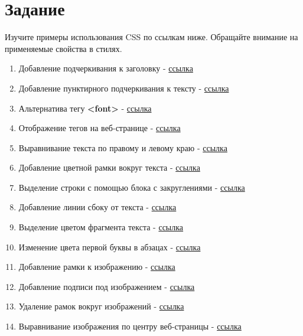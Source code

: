 \documentclass[a4paper,12pt]{extarticle}
\begin{document}
\section{Задание}
Изучите примеры использования CSS по ссылкам ниже. Обращайте внимание на
применяемые свойства в стилях.
\begin{enumerate}
  \item Добавление подчеркивания к заголовку - \href{https://htmlbook.ru/faq/kak-dobavit-podcherkivanie-k-zagolovku}{ссылка}
  \item Добавление пунктирного подчеркивания к тексту - \href{https://htmlbook.ru/faq/kak-sdelat-punktirnoe-podcherkivanie-teksta}{ссылка}
  \item Альтернатива тегу \textbf{<font>} - \href{https://htmlbook.ru/faq/kak-mne-oboytis-bez-tega-font}{ссылка}
  \item Отображение тегов на веб-странице - \href{https://htmlbook.ru/faq/kak-otobrazit-tegi-na-veb-stranitse}{ссылка}
  \item Выравнивание текста по правому и левому краю - \href{https://htmlbook.ru/faq/kak-vyrovnyat-tekst-odnovremenno-po-pravomu-i-levomu-kra}{ссылка}
  \item Добавление цветной рамки вокруг текста - \href{https://htmlbook.ru/faq/kak-dobavit-vokrug-teksta-ramku-opredelennogo-tsveta}{ссылка}
  \item  Выделение строки с помощью блока с закруглениями - \href{https://htmlbook.ru/faq/kak-vydelit-stroku-s-pomoshchyu-bloka-s-zakrugleniyami}{ссылка}
  \item Добавление линии сбоку от текста - \href{https://htmlbook.ru/faq/kak-dobavit-liniyu-vozle-teksta}{ссылка}
  \item Выделение цветом фрагмента текста - \href{https://htmlbook.ru/faq/kak-vydelit-drugim-tsvetom-fragment-teksta}{ссылка}
  \item Изменение цвета первой буквы в абзацах - \href{https://htmlbook.ru/faq/khochu-izmenit-tsvet-pervoy-bukvy-v-kazhdom-abzatse}{ссылка}
  \item Добавление рамки к изображению - \href{https://htmlbook.ru/faq/kak-dobavit-ramku-k-izobrazheniyu}{ссылка}
  \item Добавление подписи под изображением - \href{https://htmlbook.ru/faq/kak-dobavit-podpis-pod-fotografiey}{ссылка}
  \item Удаление рамок вокруг изображений - \href{https://htmlbook.ru/faq/kak-ubrat-ramku-vokrug-izobrazheniy-ssylok}{ссылка}
  \item Выравнивание изображения по центру веб-страницы - \href{https://htmlbook.ru/faq/kak-vyrovnyat-fotografiyu-po-tsentru-veb-stranitsy}{ссылка}

\end{enumerate}
\end{document}
